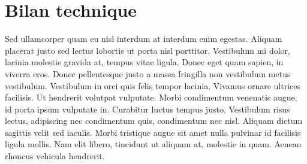 \section{Bilan technique}

Sed ullamcorper quam eu nisl interdum at interdum enim egestas. Aliquam placerat justo sed lectus lobortis ut porta nisl porttitor. Vestibulum mi dolor, lacinia molestie gravida at, tempus vitae ligula. Donec eget quam sapien, in viverra eros. Donec pellentesque justo a massa fringilla non vestibulum metus vestibulum. Vestibulum in orci quis felis tempor lacinia. Vivamus ornare ultrices facilisis. Ut hendrerit volutpat vulputate. Morbi condimentum venenatis augue, id porta ipsum vulputate in. Curabitur luctus tempus justo. Vestibulum risus lectus, adipiscing nec condimentum quis, condimentum nec nisl. Aliquam dictum sagittis velit sed iaculis. Morbi tristique augue sit amet nulla pulvinar id facilisis ligula mollis. Nam elit libero, tincidunt ut aliquam at, molestie in quam. Aenean rhoncus vehicula hendrerit.